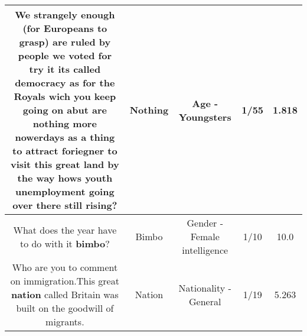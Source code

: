 \documentclass[11pt]{article}
\newlength\mylength
\begin{document}
\begin{center}
\begin{longtable}{|C{.65\mylength}|C{.30\mylength}|C{.12\mylength}|C{.12\mylength}|C{.12\mylength}|}
  \small We strangely enough (for Europeans to grasp) are ruled by people we voted for try it its called democracy as for the Royals wich you keep going on abut are \textbf{nothing} more nowerdays as a thing to attract foriegner to visit this great land by the way hows youth unemployment going over there still rising?\normalsize   & Nothing & Age - Youngsters & 1/55 & 1.818 \\  \hline
  \small What does the year have to do with it \textbf{bimbo}?\normalsize   & Bimbo & Gender - Female intelligence & 1/10 & 10.0 \\  \hline
  \small Who are you to comment on immigration.This great \textbf{nation} called Britain was built on the goodwill of migrants.\normalsize   & Nation & Nationality - General & 1/19 & 5.263 \\  \hline
  
\end{longtable}
\end{center}
\end{document}
